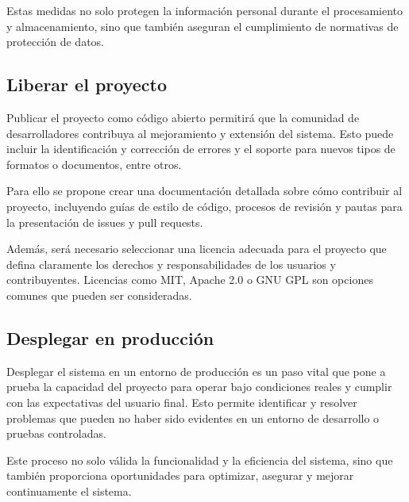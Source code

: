 Estas medidas no solo protegen la información personal durante el procesamiento y almacenamiento, sino que también
aseguran el cumplimiento de normativas de protección de datos.


\subsection*{Liberar el proyecto}

Publicar el proyecto como código abierto permitirá que la comunidad de desarrolladores contribuya al mejoramiento y
extensión del sistema.
Esto puede incluir la identificación y corrección de errores y el soporte para nuevos tipos de formatos o documentos,
entre otros.

Para ello se propone crear una documentación detallada sobre cómo contribuir al proyecto, incluyendo guías de estilo
de código, procesos de revisión y pautas para la presentación de issues y pull requests.

Además, será necesario seleccionar una licencia adecuada para el proyecto que defina claramente los derechos y
responsabilidades de los usuarios y contribuyentes.
Licencias como MIT, Apache 2.0 o GNU GPL son opciones comunes que pueden ser consideradas.

\subsection*{Desplegar en producción}

Desplegar el sistema en un entorno de producción es un paso vital que pone a prueba la capacidad del proyecto para
operar bajo condiciones reales y cumplir con las expectativas del usuario final.
Esto permite identificar y resolver problemas que pueden no haber sido evidentes en un entorno de desarrollo o
pruebas controladas.

Este proceso no solo válida la funcionalidad y la eficiencia del sistema, sino que también proporciona oportunidades
para optimizar, asegurar y mejorar continuamente el sistema.